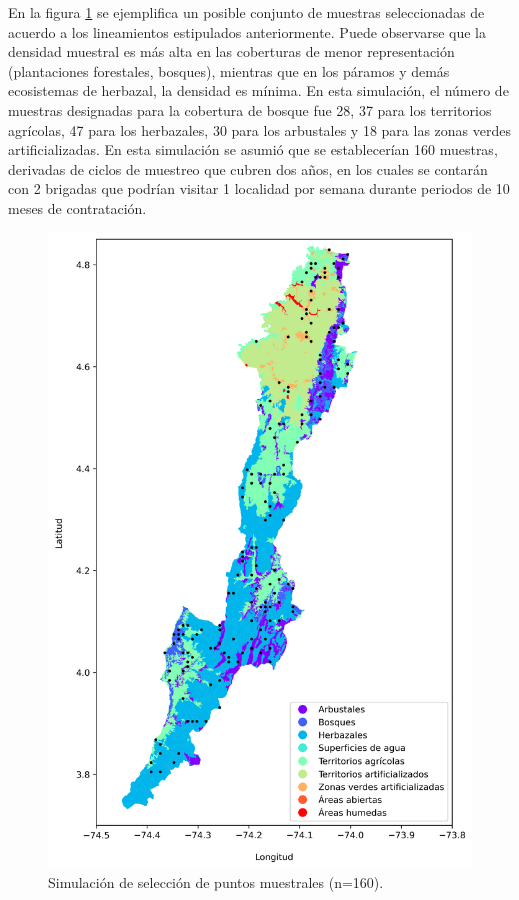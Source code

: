 \documentclass[12pt,letterpaper]{article}
\begin{document}
En la figura \ref{fig:puntos} se ejemplifica un posible conjunto de muestras seleccionadas de acuerdo a los lineamientos estipulados anteriormente. Puede observarse que la densidad muestral es m\'as alta en las coberturas de menor representaci\'on (plantaciones forestales, bosques), mientras que en los p\'aramos y dem\'as ecosistemas de herbazal, la densidad es m\'inima. En esta simulaci\'on, el n\'umero de muestras designadas para la cobertura de bosque fue 28, 37 para los territorios agrícolas, 47 para los herbazales, 30 para los arbustales y 18 para las zonas verdes artificializadas. En esta simulación se asumió  que se establecerían 160 muestras, derivadas de ciclos de muestreo que cubren dos años, en los cuales se contarán con 2 brigadas que podrían visitar 1 localidad por semana durante periodos de 10 meses de contratación. 

\begin{figure}
    \centering
    \includegraphics[height=0.9\textheight]{sitios_muestreo.png}
    \caption{Simulación de selección de puntos muestrales (n=160).}
    \label{fig:puntos}
\end{figure}
\end{document}
